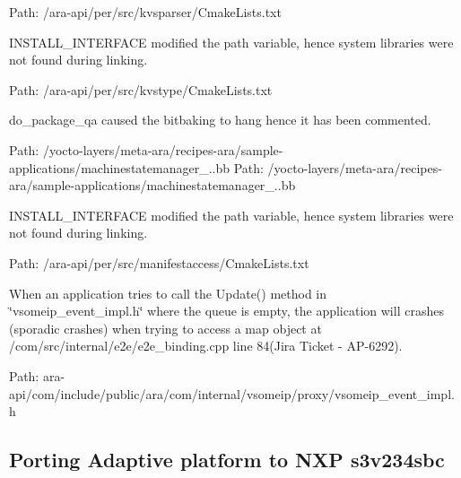 \begin{DoxyEnumerate}
Path\+: /ara-\/api/per/src/kvsparser/\+Cmake\+Lists.txt 
\item I\+N\+S\+T\+A\+L\+L\+\_\+\+I\+N\+T\+E\+R\+F\+A\+CE modified the path variable, hence system libraries were not found during linking.

Path\+: /ara-\/api/per/src/kvstype/\+Cmake\+Lists.txt 
\item do\+\_\+package\+\_\+qa caused the bitbaking to hang hence it has been commented.

Path\+: /yocto-\/layers/meta-\/ara/recipes-\/ara/sample-\/applications/machinestatemanager\+\_..\+bb  Path\+: /yocto-\/layers/meta-\/ara/recipes-\/ara/sample-\/applications/machinestatemanager\+\_..\+bb 
\item I\+N\+S\+T\+A\+L\+L\+\_\+\+I\+N\+T\+E\+R\+F\+A\+CE modified the path variable, hence system libraries were not found during linking.

Path\+: /ara-\/api/per/src/manifestaccess/\+Cmake\+Lists.txt 
\item When an application tries to call the Update() method in \char`\"{}vsomeip\+\_\+event\+\_\+impl.\+h\char`\"{} where the queue is empty, the application will crashes (sporadic crashes) when trying to access a map object at /com/src/internal/e2e/e2e\+\_\+binding.cpp line 84(Jira Ticket -\/ A\+P-\/6292).

Path\+: ara-\/api/com/include/public/ara/com/internal/vsomeip/proxy/vsomeip\+\_\+event\+\_\+impl.\+h  \subsection*{Porting Adaptive platform to N\+XP s3v234sbc}
\end{DoxyEnumerate}
